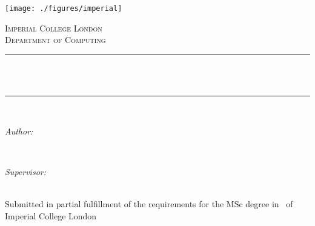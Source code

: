 \begin{titlepage}

\newcommand{\HRule}{\rule{\linewidth}{0.5mm}} %



\texttt{[image: ./figures/imperial]}\\[0.5cm] 

\center %


\textsc{\Large Imperial College London}\\[0.5cm] 
\textsc{\large Department of Computing}\\[0.5cm] 


\HRule \\[0.4cm]
{ \huge \bfseries \reporttitle}\\ %
\HRule \\[1.5cm]
 

\begin{minipage}{0.4\textwidth}
\begin{flushleft} \large
\emph{Author:}\\
\reportauthor %
\end{flushleft}
\end{minipage}
~
\begin{minipage}{0.4\textwidth}
\begin{flushright} \large
\emph{Supervisor:} \\
\supervisor %
\end{flushright}
\end{minipage}\\[4cm]


\vfill %
Submitted in partial fulfillment of the requirements for the MSc degree in
\degreetype~of Imperial College London\\[0.5cm]

\makeatletter
\@date 
\makeatother


\end{titlepage}

